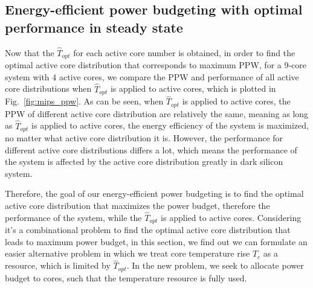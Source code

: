 \subsection{Energy-efficient power budgeting with optimal performance in steady state}
Now that the $\hat{T}_{opt}$ for each active core number is obtained, in order to find the optimal active core distribution that corresponds to maximum PPW, for a $9$-core system with $4$ active cores, we compare the PPW and performance of all active core distributions when $\hat{T}_{opt}$ is applied to active cores, which is plotted in Fig.~\ref{fig:mips_ppw}. As can be seen, when $\hat{T}_{opt}$ is applied to active cores, the PPW of different active core distribution are relatively the same, meaning as long as $\hat{T}_{opt}$ is applied to active cores, the energy efficiency of the system is maximized, no matter what active core distribution it is. However, the performance for different active core distributions differs a lot, which means the performance of the system is affected by the active core distribution greatly in dark silicon system.

Therefore, the goal of our energy-efficient power budgeting is to find the optimal active core distribution that maximizes the power budget, therefore the performance of the system, while the $\hat{T}_{opt}$ is applied to active cores. Considering it's a combinational problem to find the optimal active core distribution that leads to maximum power budget, in this section, we find out we can formulate an easier alternative problem in which we treat core temperature rise $T_{c}$ as a resource, which is limited by $\hat{T}_{opt}$. In the new problem, we seek to allocate power budget to cores, such that the temperature resource is fully used.

